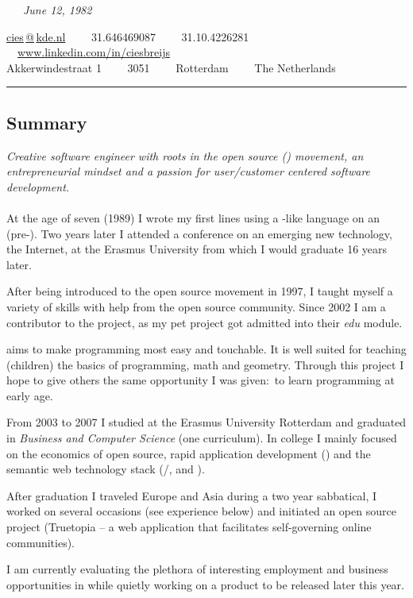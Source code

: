 \documentclass[10pt,a4paper]{article}
\begin{document}
\ \ \ \emph{June 12, 1982}

\vspace{0.3em}
\hspace{-\parindent}\href{mailto:cies.at.kde.dot.nl}{cies$\,\!$@$\,\!$kde.nl}\ \ \textbullet  %
\ \ \textsmaller{+}31.646469087\ \ \textbullet
\ \ \textsmaller{+}31.10.4226281\ \ \textbullet
\ \ \href{http://www.linkedin.com/in/ciesbreijs}{www.linkedin.com/in/ciesbreijs}
\\
Akkerwindestraat 1\ \ \textbullet
\ \ 3051\ \ \textbullet
\ \ Rotterdam\ \ \textbullet
\ \ The Netherlands
\vspace{0.9em}


\hrule \vspace{-0.4em} \subsection*{Summary}

\vspace{-1.1em}
\begin{multicols}{2}
\noindent \emph{Creative software engineer with roots in the open source () movement, an entrepreneurial mindset and a passion for user/customer centered software development.}
\\
\\
At the age of seven (1989) I wrote my first lines using a -like language on an  (pre-). Two years later I attended a conference on an emerging new technology, the Internet, at the Erasmus University from which I would graduate 16 years later.

After being introduced to the open source movement in 1997, I taught myself a variety of skills with help from the open source community. Since 2002 I am a contributor to the  project, as my pet project \KTurtle got admitted into their \emph{edu} module.

\KTurtle aims to make programming most easy and touchable. It is well suited for teaching (children) the basics of programming, math and geometry. Through this project I hope to give others the same opportunity I was given:\ to learn programming at early age.

From 2003 to 2007 I studied at the Erasmus University Rotterdam and graduated in \emph{Business and Computer Science} (one curriculum). In college I mainly focused on the economics of open source, rapid application development () and the semantic web technology stack (/,  and ).

After graduation I traveled Europe and Asia during a two year sabbatical, I worked on several occasions (see experience below) and initiated an open source project (Truetopia -- a web application that facilitates self-governing online communities).

I am currently evaluating the plethora of interesting employment and business opportunities in  while quietly working on a product to be released later this year.
\end{multicols}
\end{document}
